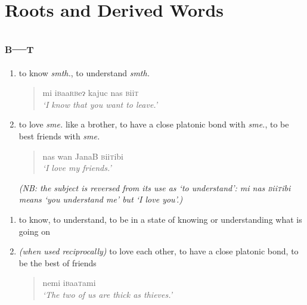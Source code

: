 \documentclass[a4paper,10pt,twoside,openright]{memoir}
\newcommand{\lilglot}{ɂ}
\newcommand{\famword}[5]{#1\textsc{#2}#3\textsc{#4}#5}
\begin{document}
\chapter{Roots and Derived Words}
\begin{multicols*}{2}
\section{\textsc{b---t}}
\begin{description}[leftmargin=*]
    \begin{enumerate}
        \item to know \textit{smth.}, to understand \textit{smth.}
        \begin{quote}
            mi i\textsc{b}aa\textsc{rb}e\lilglot{} kajuc nas \textsc{b}ii\textsc{t}\\
            \textit{`I know that you want to leave.'}
        \end{quote}
        \item to love \textit{sme.} like a brother, to have a close platonic bond with \textit{sme.}, to be best friends with \textit{sme.}
        \begin{quote}
            nas wan \textsc{J}ana\textsc{B} \textsc{b}ii\textsc{t}ibi\\
            \textit{`I love my friends.'}
        \end{quote}
        \textit{(NB: the subject is reversed from its use as `to understand': \emph{mi nas \textsc{b}ii\textsc{t}ibi} means `you understand me' but `I love you'.)}
    \end{enumerate}
    \newentry{\famword{i}{b}{aa}{t}{}}{v.intr.}
    \begin{enumerate}
        \item to know, to understand, to be in a state of knowing or understanding what is going on
        \item \textit{(when used reciprocally)} to love each other, to have a close platonic bond, to be the best of friends
        \begin{quote}
            nemi i\textsc{b}aa\textsc{t}ami\\
            \textit{`The two of us are thick as thieves.'}
        \end{quote}
    \end{enumerate}
\end{description}


\end{multicols*}
\end{document}
